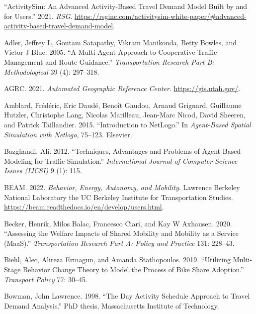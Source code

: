 \documentclass[12pt, oneside, openright]{byuthesis}
\newlength{\cslhangindent}
\newlength{\cslentryspacingunit} %
\newenvironment{CSLReferences}[2] %
 {%
  \setlength{\parindent}{0pt}
  \ifodd #1
  \let\oldpar\par
  \def\par{\hangindent=\cslhangindent\oldpar}
  \fi
  \setlength{\parskip}{#2\cslentryspacingunit}
 }%
 {}
\begin{document}
\hypertarget{refs}{}
\begin{CSLReferences}{1}{0}
\leavevmode{}%
{``ActivitySim: An Advanced Activity-Based Travel Demand Model Built by and for Users.''} 2021. \emph{RSG}. \url{https://rsginc.com/activitysim-white-paper/\#advanced-activity-based-travel-demand-model}.

\leavevmode{}%
Adler, Jeffrey L, Goutam Satapathy, Vikram Manikonda, Betty Bowles, and Victor J Blue. 2005. {``A Multi-Agent Approach to Cooperative Traffic Management and Route Guidance.''} \emph{Transportation Research Part B: Methodological} 39 (4): 297--318.

\leavevmode{}%
AGRC. 2021. \emph{Automated Geographic Reference Center}. \url{https://gis.utah.gov/}.

\leavevmode{}%
Amblard, Frédéric, Eric Daudé, Benoît Gaudou, Arnaud Grignard, Guillaume Hutzler, Christophe Lang, Nicolas Marilleau, Jean-Marc Nicod, David Sheeren, and Patrick Taillandier. 2015. {``Introduction to NetLogo.''} In \emph{Agent-Based Spatial Simulation with Netlogo}, 75--123. Elsevier.

\leavevmode{}%
Bazghandi, Ali. 2012. {``Techniques, Advantages and Problems of Agent Based Modeling for Traffic Simulation.''} \emph{International Journal of Computer Science Issues (IJCSI)} 9 (1): 115.

\leavevmode{}%
BEAM. 2022. \emph{Behavior, Energy, Autonomy, and Mobility}. Lawrence Berkeley National Laboratory the UC Berkeley Institute for Transportation Studies. \url{https://beam.readthedocs.io/en/develop/users.html}.

\leavevmode{}%
Becker, Henrik, Milos Balac, Francesco Ciari, and Kay W Axhausen. 2020. {``Assessing the Welfare Impacts of Shared Mobility and Mobility as a Service (MaaS).''} \emph{Transportation Research Part A: Policy and Practice} 131: 228--43.

\leavevmode{}%
Biehl, Alec, Alireza Ermagun, and Amanda Stathopoulos. 2019. {``Utilizing Multi-Stage Behavior Change Theory to Model the Process of Bike Share Adoption.''} \emph{Transport Policy} 77: 30--45.

\leavevmode{}%
Bowman, John Lawrence. 1998. {``The Day Activity Schedule Approach to Travel Demand Analysis.''} PhD thesis, Massachusetts Institute of Technology.


\end{CSLReferences}
\end{document}
